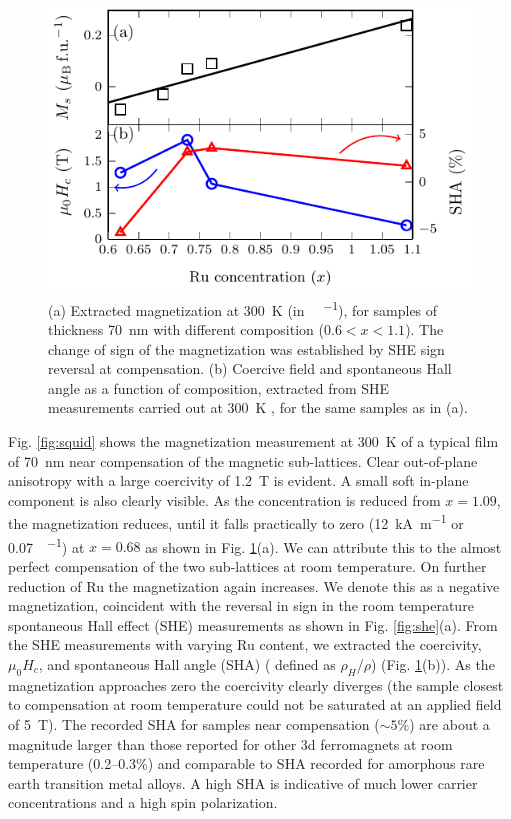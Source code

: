 \documentclass[reprint,aip,apl,floatfix,linenumbers,superscriptaddress]{revtex4-1}
\begin{document}
\begin{figure}
\includegraphics[width=1.0\columnwidth]{Transport-Fig3.pdf}
\caption{(a) Extracted magnetization at \SI{300}{\kelvin} (in \SI{}{
\BohrMagneton\per\formulaunit}), for samples of thickness \SI{70}{\nano\metre}
 with different  composition ($0.6<x<1.1$). The change of sign of the 
magnetization was established by SHE sign reversal at compensation. (b) 
Coercive field  and spontaneous Hall angle as a function of  
composition, extracted from SHE measurements carried out at \SI{300}{\kelvin}
, for the same  samples as in (a).}
\label{fig:ru_conc}
\end{figure}

Fig. \ref{fig:squid} shows the magnetization measurement at \SI{300}{\kelvin} 
of a typical  film of \SI{70}{\nano\metre} near compensation of the 
magnetic sub-lattices. Clear out-of-plane anisotropy with a large coercivity 
of \SI{1.2}{\tesla} is evident.  A small soft in-plane component is also 
clearly visible. As the  concentration is reduced from $x=\num{1.09}$, 
the magnetization reduces, until it falls practically to zero (\SI{12}{
\kilo\ampere\per\metre} or \SI{0.07}{\BohrMagneton\per\formulaunit}) at $x=
\num{0.68}$ as shown in Fig. \ref{fig:ru_conc}(a). We can attribute this to 
the almost perfect compensation of the two  sub-lattices at room 
temperature. On further reduction of Ru the magnetization again increases. We 
denote this as a negative magnetization, coincident with the reversal in sign 
in the room temperature spontaneous Hall effect (SHE) measurements as shown 
in Fig. \ref{fig:she}(a). From the SHE measurements with varying Ru content, 
we extracted the coercivity, $\mu_0H_c$, and spontaneous Hall angle (SHA) (
defined as $\rho_H$/$\rho$) (Fig. \ref{fig:ru_conc}(b)). As the magnetization 
approaches zero the coercivity clearly diverges (the sample closest to 
compensation at room temperature could not be saturated at an applied field 
of \SI{5}{\tesla}). The recorded SHA for samples near compensation ($\sim \num
{5}\%$) are about a magnitude larger than those reported for other 3d 
ferromagnets at room temperature (\numrange{0.2}{0.3}\%)\cite{dorleijn1976} 
and comparable to SHA recorded for amorphous rare earth transition metal 
alloys\cite{Kim2001}. A high SHA is indicative of much lower carrier 
concentrations and a high spin polarization.
\end{document}
